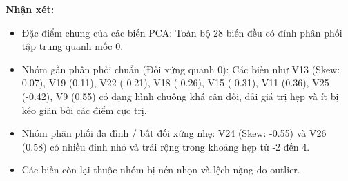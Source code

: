 \textbf{Nhận xét:}
\begin{itemize}
    \item Đặc điểm chung của các biến PCA: Toàn bộ 28 biến đều có đỉnh phân phối tập trung quanh mốc 0.
    \item Nhóm gần phân phối chuẩn (Đối xứng quanh 0): Các biến như V13 (Skew: 0.07), V19 (0.11), V22 (-0.21), V18 (-0.26), V15 (-0.31), V11 (0.36), V25 (-0.42), V9 (0.55) có dạng hình chuông khá cân đối, dải giá trị hẹp và ít bị kéo giãn bởi các điểm cực trị.
    \item Nhóm phân phối đa đỉnh / bất đối xứng nhẹ: V24 (Skew: -0.55) và V26 (0.58) có nhiều đỉnh nhỏ và trải rộng trong khoảng hẹp từ -2 đến 4.
    \item Các biến còn lại thuộc nhóm bị nén nhọn và lệch nặng do outlier.
\end{itemize}


